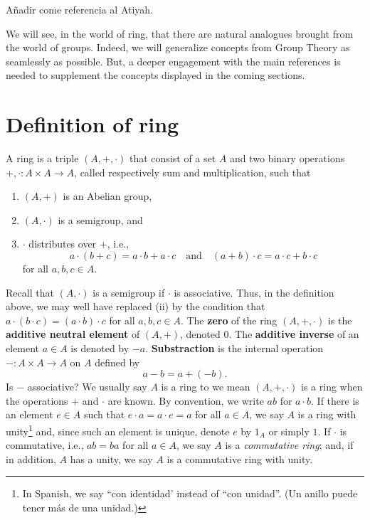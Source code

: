 \documentclass[11pt,a4paper]{article}
\begin{document}
\def\contador{Lesson 9}

\label{class:rings}

Añadir come referencia al Atiyah.

We will see, in the world of ring, that there are natural analogues brought from the world of groups. Indeed, we will generalize concepts from Group Theory as seamlessly as possible. But, a deeper engagement with the main references is needed to supplement the concepts displayed in the coming sections.
%

\section{Definition of ring}

\begin{defi}
    A ring is a triple $(A,+,\cdot)$ that consist of a set  \(A\) and two binary operations \(+,\cdot\colon A\times A\to A\), called respectively sum and multiplication, such that 
\begin{enumerate}[label=(\roman*)]
    \item $(A,+)$ is an Abelian group,
    \item $(A,\cdot)$ is a semigroup, and
    \item \(\cdot\) distributes over \(+\), i.e., \[a \cdot (b+c) = a\cdot b + a\cdot c\quad\text{and}\quad(a+b)\cdot c= a\cdot c + b\cdot c\]
    for all \(a,b,c \in A\).
\end{enumerate}
\end{defi}

%
Recall that  $(A,\cdot)$ is a semigroup if \(\cdot\) is associative.
Thus, in the definition above, we may well have replaced (ii) by the condition that \(a\cdot(b\cdot c) = (a \cdot b)\cdot c\) for all \(a,b,c\in A\).
The \textbf{zero} of the ring \((A,+,\cdot)\) is the  \textbf{additive neutral element} of $(A,+)$, denoted $0$.
The \textbf{additive inverse} of an element $a\in A$ is denoted by $-a$.
\textbf{Substraction} is the internal operation \(-\colon A\times A\to A\) on $A$ defined by
\[
a-b = a+(-b).
\]
Is \(-\) associative?
We usually say \(A\) is a ring to we mean \((A,+,\cdot)\) is a ring when the operations \(+\) and \(\cdot\) are known.
By convention, we write $ab$ for  $a\cdot b$.
If there is an element \(e\in A\) such that \(e \cdot a = a \cdot e = a\) for all \(a\in A\), we say \(A\) is a ring with unity\footnote{In Spanish, we say ``con identidad' instead of ``con unidad''. (Un anillo puede tener más de una unidad.)}
and, since such an element is unique,  denote  \(e\) by \(1_A\) or simply \(1\). 
If \(\cdot\) is commutative, i.e., \(ab = ba\) for all \(a\in A\), we say \(A\) is a \textit{commutative ring}; and, if in addition, \(A\) has a unity, we say \(A\) is a commutative ring with unity.
\end{document}
